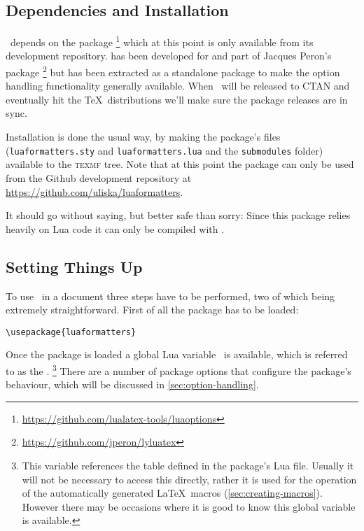 \documentclass[12pt]{scrartcl}
\begin{document}
\subsection{Dependencies and Installation}
\label{sec:dependencies-and-installation}

\luaformatters\ depends on the  package%
\footnote{\url{https://github.com/lualatex-tools/luaoptions}} %
which at this point is only available from its development repository.  has been developed for and part of Jacques Peron's  package%
\footnote{\url{https://github.com/jperon/lyluatex}} %
but has been extracted as a standalone package to make the option handling
functionality generally available.  When \luaformatters\ will be released to
CTAN and eventually hit the \TeX\ distributions we'll make sure the package
releases are in sync.

Installation is done the usual way, by making the package's files
(\texttt{luaformatters.sty} and \texttt{luaformatters.lua} and the
\texttt{submodules} folder) available to the \textsc{texmf} tree. Note that at
this point the package can only be used from the Github development repository
at \url{https://github.com/uliska/luaformatters}.

 It should go without saying, but better safe than sorry: Since
this package relies heavily on Lua code it can only be compiled with
.


\subsection{Setting Things Up}
\label{sec:setup}

To use \luaformatters\ in a document three steps have to be performed,
two of which being extremely straightforward. First of all the package
has to be loaded:

\begin{verbatim}
\usepackage{luaformatters}
\end{verbatim}

\noindent Once the package is loaded a global Lua variable \luaformatters\ is
available, which is referred to as the .%
\footnote{This variable references the  table defined in the
package's Lua file.  Usually it will not be necessary to access this directly,
rather it is used for the operation of the automatically generated \LaTeX\
macros (\vref{sec:creating-macros}). However there may be occasions where it is
good to know this global variable is available.} %
There are a number of package options that configure the package's behaviour,
which will be discussed in \vref{sec:option-handling}.%
\end{document}
